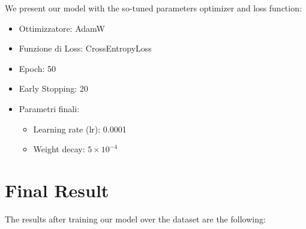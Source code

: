 \documentclass{article}
\begin{document}
We present our model with the so-tuned parameters optimizer and loss function:
\begin{itemize}
  \item Ottimizzatore: AdamW
  \item Funzione di Loss: CrossEntropyLoss
  \item Epoch: 50
  \item Early Stopping: 20
  \item Parametri finali:
  \begin{itemize}
    \item Learning rate (lr): 0.0001
    \item Weight decay: $5 \times 10^{-4}$
  \end{itemize}
\end{itemize}



\section{Final Result}
The results after training our model over the dataset are the following:
\begin{table}[htbp]
\centering
\caption{Performance Metrics}
\label{tab:performance_metrics}
\end{table}
\end{document}
